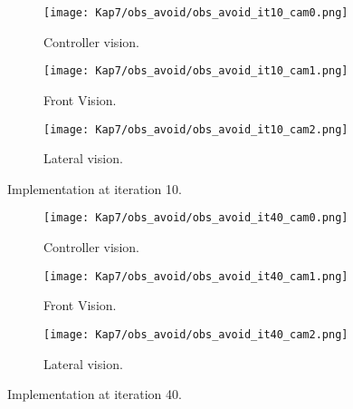 
\begin{figure}
\centering
\begin{subfigure}[t]{\textwidth}
    \texttt{[image: Kap7/obs\_avoid/obs\_avoid\_it10\_cam0.png]}
    \caption{Controller vision.}
    \label{fig:first}
\end{subfigure}
\vspace{1cm}
\begin{subfigure}[b]{0.4\textwidth}
    \texttt{[image: Kap7/obs\_avoid/obs\_avoid\_it10\_cam1.png]}
    \caption{Front Vision.}
    \label{fig:second}
\end{subfigure}
\hfill
\begin{subfigure}[b]{0.50\textwidth}
    \texttt{[image: Kap7/obs\_avoid/obs\_avoid\_it10\_cam2.png]}
    \caption{Lateral vision.}
    \label{fig:third}
\end{subfigure}
\caption{Implementation at iteration 10.}
\label{fig:figures}
\end{figure}





\begin{figure}
\centering
\begin{subfigure}[t]{\textwidth}
    \texttt{[image: Kap7/obs\_avoid/obs\_avoid\_it40\_cam0.png]}
    \caption{Controller vision.}
    \label{fig:first}
\end{subfigure}
\vspace{1cm}
\begin{subfigure}[b]{0.4\textwidth}
    \texttt{[image: Kap7/obs\_avoid/obs\_avoid\_it40\_cam1.png]}
    \caption{Front Vision.}
    \label{fig:second}
\end{subfigure}
\hfill
\begin{subfigure}[b]{0.50\textwidth}
    \texttt{[image: Kap7/obs\_avoid/obs\_avoid\_it40\_cam2.png]}
    \caption{Lateral vision.}
    \label{fig:third}
\end{subfigure}
\caption{Implementation at iteration 40.}
\label{fig:figures}
\end{figure}





